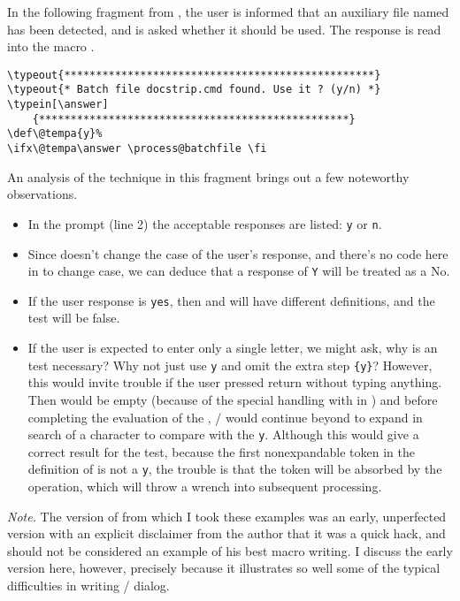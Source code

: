 {In the following fragment from , the user is
informed that an auxiliary file named  has been
detected, and is asked whether it should be used. The response is
read into the macro .
  \begin{verbatim}
\typeout{*************************************************}
\typeout{* Batch file docstrip.cmd found. Use it ? (y/n) *}
\typein[\answer]
    {*************************************************}
\def\@tempa{y}%
\ifx\@tempa\answer \process@batchfile \fi
  \end{verbatim}
An analysis of  the technique in this fragment brings
out a few noteworthy observations.
 \begin{itemize}
  \item In the prompt (line 2) the acceptable responses are
listed: \verb;y; or \verb;n;.
  \item Since  doesn't change the case
of the user's response, and there's no code here in
 to change case, we can deduce that a
response of \verb;Y; will be treated as a No.
  \item If the user response is \verb;yes;, then 
and  will have different definitions, and the
 test will be false.
  \item If the user is expected to enter only a single letter,
we might ask, why is an  test necessary? Why not
just use  \verb|y|
and omit the extra step \verb|{y}|?
However, this would invite trouble if the user pressed
{\sc return} without typing anything.  Then  would
be empty (because of the special handling with 
in ) and before completing the evaluation of
the , \tex/ would continue beyond 
to expand  in search of a character
to compare with the \verb;y;. Although this would give a correct
result for the  test, because the
first nonexpandable
token in the definition of 
is not a \verb;y;, the trouble is that the token will be
absorbed by the  operation, which will throw a wrench
into subsequent processing.

\end{itemize}

{\it Note.} The version of  from which I took these
examples was an early, unperfected version  with an explicit
disclaimer from the author that it was a quick hack, and should not be
considered an example of his best macro writing. I discuss the early
version here, however, precisely because it illustrates so well some
of the typical difficulties in writing \tex/ dialog.

}
